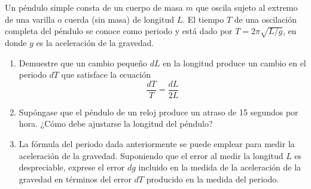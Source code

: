 \item Un péndulo simple consta de un cuerpo de masa $m$ que oscila sujeto al extremo de una varilla o cuerda (sin masa) de longitud $L$. El tiempo $T$ de una oscilación completa del péndulo se conoce como periodo y está dado por $T = 2\pi\sqrt{L/g}$, en donde $g$ es la aceleración de la gravedad.
\begin{enumerate}
    \item[(a)] Demuestre que un cambio pequeño $dL$ en la longitud produce un cambio en el periodo $dT$ que satisface la ecuación
    $$\frac{dT}{T} = \frac{dL}{2L}$$
    \item[(b)] Supóngase que el péndulo de un reloj produce un atraso de 15 segundos por hora. ¿Cómo debe ajustarse la longitud del péndulo?
    \item[(c)] La fórmula del periodo dada anteriormente se puede emplear para medir la aceleración de la gravedad. Suponiendo que el error al medir la longitud $L$ es despreciable, exprese el error $dg$ incluido en la medida de la aceleración de la gravedad en términos del error $dT$ producido en la medida del periodo.
\end{enumerate}
\begin{center}
\end{center}
